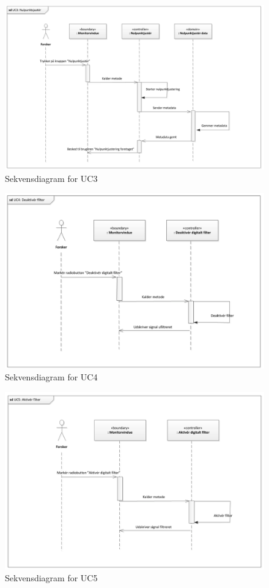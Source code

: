 \begin{figure}[H]
	\centering
	\includegraphics[width=1\textwidth]{Figurer/Snip20151102_11}
	\caption{Sekvensdiagram for UC3}
\end{figure}

\begin{figure}[H]
	\centering
	\includegraphics[width=1\textwidth]{Figurer/Snip20151102_12}
	\caption{Sekvensdiagram for UC4}
\end{figure}

\begin{figure}[H]
	\centering
	\includegraphics[width=1\textwidth]{Figurer/Snip20151102_13}
	\caption{Sekvensdiagram for UC5}
\end{figure}

